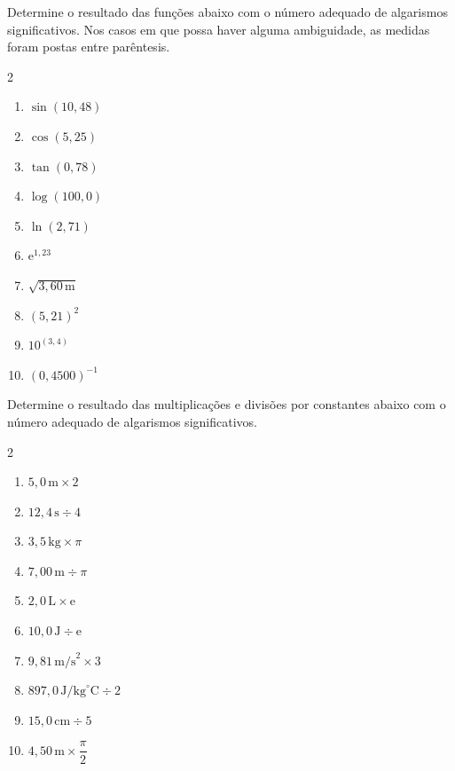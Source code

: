 \begin{question}[type={exam}]
Determine o resultado das funções abaixo com o número adequado de algarismos significativos. Nos casos em que possa haver alguma ambiguidade, as medidas foram postas entre parêntesis.
\begin{multicols}{2}
\begin{enumerate}
\item $\sin(10{,}48)$
\item $\cos(5{,}25)$
\item $\tan(0{,}78)$
\item $\log(100{,}0)$
\item $\ln(2{,}71)$
\item $\mathrm{e}^{1{,}23}$
\item $\sqrt{3{,}60\,\text{m}}$
\item $(5{,}21)^2$
\item $10^{(3{,}4)}$
\item $(0{,}4500)^{-1}$
\end{enumerate}
\end{multicols}
\end{question}

\begin{question}[type={exam}]
Determine o resultado das multiplicações e divisões por constantes abaixo com o número adequado de algarismos significativos.
\begin{multicols}{2}
\begin{enumerate}
\item $5{,}0\,\text{m} \times 2$
\item $12{,}4\,\text{s} \div 4$
\item $3{,}5\,\text{kg} \times \pi$
\item $7{,}00\,\text{m} \div \pi$
\item $2{,}0\,\text{L} \times \mathrm{e}$
\item $10{,}0\,\text{J} \div \mathrm{e}$
\item $9{,}81\,\text{m/s}^2 \times 3$
\item $897{,}0 \, \text{J/kg}^\circ\text{C} \div 2$
\item $15{,}0\,\text{cm} \div 5$
\item $4{,}50\,\text{m} \times \dfrac{\pi}{2}$
\end{enumerate}
\end{multicols}
\end{question}

